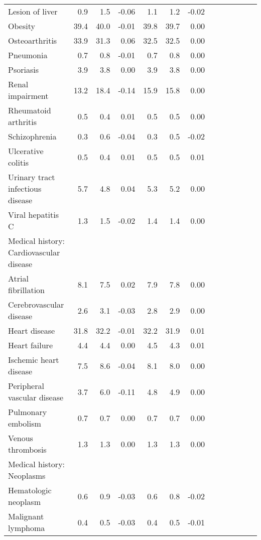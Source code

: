 \documentclass[11pt,]{article}
\begin{document}
\begin{longtable}{lrrrrrrrrrrrr}
      Lesion of liver &   0.9 &   1.5 & -0.06 &   1.1 &   1.2 & -0.02 \\ 
      Obesity &  39.4 &  40.0 & -0.01 &  39.8 &  39.7 &  0.00 \\ 
      Osteoarthritis &  33.9 &  31.3 &  0.06 &  32.5 &  32.5 &  0.00 \\ 
      Pneumonia &   0.7 &   0.8 & -0.01 &   0.7 &   0.8 &  0.00 \\ 
      Psoriasis &   3.9 &   3.8 &  0.00 &   3.9 &   3.8 &  0.00 \\ 
      Renal impairment &  13.2 &  18.4 & -0.14 &  15.9 &  15.8 &  0.00 \\ 
      Rheumatoid arthritis &   0.5 &   0.4 &  0.01 &   0.5 &   0.5 &  0.00 \\ 
      Schizophrenia &   0.3 &   0.6 & -0.04 &   0.3 &   0.5 & -0.02 \\ 
      Ulcerative colitis &   0.5 &   0.4 &  0.01 &   0.5 &   0.5 &  0.01 \\ 
      Urinary tract infectious disease &   5.7 &   4.8 &  0.04 &   5.3 &   5.2 &  0.00 \\ 
      Viral hepatitis C &   1.3 &   1.5 & -0.02 &   1.4 &   1.4 &  0.00 \\ 
  Medical history: Cardiovascular disease &     &     &     &     &     &     \\ 
      Atrial fibrillation &   8.1 &   7.5 &  0.02 &   7.9 &   7.8 &  0.00 \\ 
      Cerebrovascular disease &   2.6 &   3.1 & -0.03 &   2.8 &   2.9 &  0.00 \\ 
      Heart disease &  31.8 &  32.2 & -0.01 &  32.2 &  31.9 &  0.01 \\ 
      Heart failure &   4.4 &   4.4 &  0.00 &   4.5 &   4.3 &  0.01 \\ 
      Ischemic heart disease &   7.5 &   8.6 & -0.04 &   8.1 &   8.0 &  0.00 \\ 
      Peripheral vascular disease &   3.7 &   6.0 & -0.11 &   4.8 &   4.9 &  0.00 \\ 
      Pulmonary embolism &   0.7 &   0.7 &  0.00 &   0.7 &   0.7 &  0.00 \\ 
      Venous thrombosis &   1.3 &   1.3 &  0.00 &   1.3 &   1.3 &  0.00 \\ 
  Medical history: Neoplasms &     &     &     &     &     &     \\ 
      Hematologic neoplasm &   0.6 &   0.9 & -0.03 &   0.6 &   0.8 & -0.02 \\ 
      Malignant lymphoma &   0.4 &   0.5 & -0.03 &   0.4 &   0.5 & -0.01 \\ 

\end{longtable}
\end{document}
